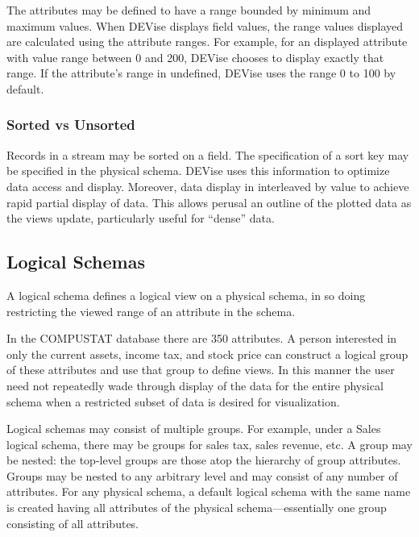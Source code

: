 The attributes may be defined to have a range bounded by minimum and maximum
values. When DEVise displays field values, the range values displayed are
calculated using the attribute ranges. For example, for an displayed attribute
with value range between 0 and 200, DEVise chooses to display exactly that
range. If the attribute's range in undefined, DEVise uses the range 0 to 100 by
default.

\subsubsection{Sorted vs Unsorted}

Records in a stream may be sorted on a field. The specification of a sort key
may be specified in the physical schema. DEVise uses this information to
optimize data access and display. Moreover, data display in interleaved by value
to achieve rapid partial display of data. This allows perusal an outline of the
plotted data as the views update, particularly useful for ``dense'' data.


\subsection{Logical Schemas}
\label{sect:log_schema}

A logical schema defines a logical view on a physical schema, in so doing
restricting the viewed range of an attribute in the schema.

In the COMPUSTAT database there are 350 attributes. A person interested in only
the current assets, income tax, and stock price can construct a logical group of
these attributes and use that group to define views. In this manner the user
need not repeatedly wade through display of the data for the entire physical
schema when a restricted subset of data is desired for visualization.

Logical schemas may consist of multiple groups. For example, under a Sales
logical schema, there may be groups for sales tax, sales revenue, etc. A group
may be nested: the top-level groups are those atop the hierarchy of group
attributes. Groups may be nested to any arbitrary level and may consist of any
number of attributes. For any physical schema, a default logical schema with the
same name is created having all attributes of the physical schema---essentially
one group consisting of all attributes.

